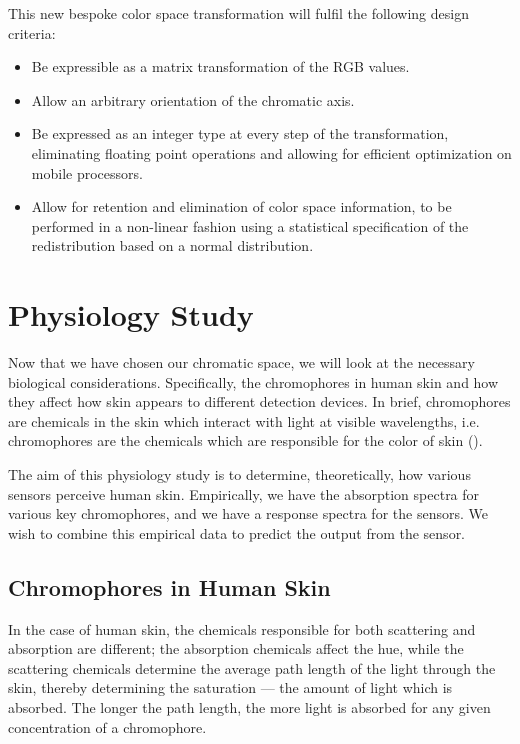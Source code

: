 This new bespoke color space transformation will fulfil the following design criteria:

\begin{itemize}
\item Be expressible as a matrix transformation of the RGB values.
\item Allow an arbitrary orientation of the chromatic axis.
\item Be expressed as an integer type at every step of the transformation, eliminating floating point operations and allowing for efficient optimization on mobile processors.
\item Allow for retention and elimination of color space information, to be performed in a non-linear fashion using a statistical specification of the redistribution based on a normal distribution.
\end{itemize}


\section{Physiology Study}\label{sec:PhysiologyStudy}

Now that we have chosen our chromatic space, we will look at the necessary biological considerations. Specifically, the chromophores in human skin and how they affect how skin appears to different detection devices. In brief, chromophores are chemicals in the skin which interact with light at visible wavelengths, i.e. chromophores are the chemicals which are responsible for the color of skin (\cite{Anderson1981}).

The aim of this physiology study is to determine, theoretically, how various sensors perceive human skin. Empirically, we have the absorption spectra for various key chromophores, and we have a response spectra for the sensors. We wish to combine this empirical data to predict the output from the sensor. 

\subsection{Chromophores in Human Skin}

In the case of human skin, the chemicals responsible for both scattering and absorption are different; the absorption chemicals affect the hue, while the scattering chemicals determine the average path length of the light through the skin, thereby determining the saturation --- the amount of light which is absorbed. The longer the path length, the more light is absorbed for any given concentration of a chromophore. 

